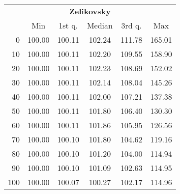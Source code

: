 \begin{tabular}{r|ccccc}
  \multicolumn{6}{c}{{\bf Zelikovsky}} \\
  & Min & 1st q. & Median & 3rd q. & Max \\ \hline\hline
  0 & 100.00 & 100.11 & 102.24 & 111.78 & 165.01
\\ 10 & 100.00 & 100.11 & 102.20 & 109.55 & 158.90
\\ 20 & 100.00 & 100.11 & 102.23 & 108.69 & 152.02
\\ 30 & 100.00 & 100.11 & 102.14 & 108.04 & 145.26
\\ 40 & 100.00 & 100.11 & 102.00 & 107.21 & 137.38
\\ 50 & 100.00 & 100.11 & 101.80 & 106.40 & 130.30
\\ 60 & 100.00 & 100.11 & 101.86 & 105.95 & 126.56
\\ 70 & 100.00 & 100.10 & 101.80 & 104.62 & 119.16
\\ 80 & 100.00 & 100.10 & 101.20 & 104.00 & 114.94
\\ 90 & 100.00 & 100.10 & 101.09 & 102.63 & 114.95
\\ 100 & 100.00 & 100.07 & 100.27 & 102.17 & 114.96
\end{tabular}
